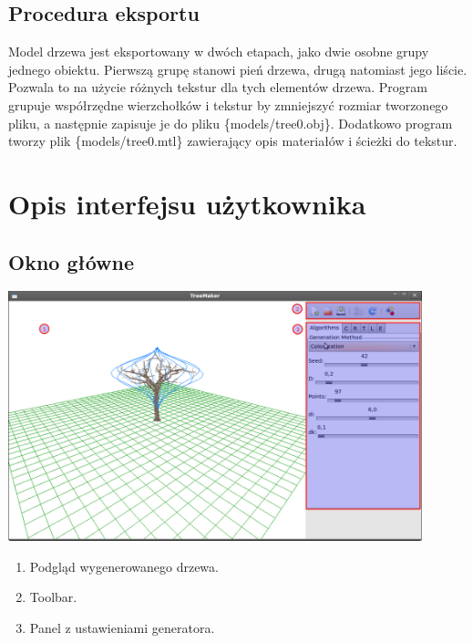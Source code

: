 \subsection{Procedura eksportu}
Model drzewa jest eksportowany w dwóch etapach, jako dwie osobne grupy jednego obiektu. Pierwszą grupę stanowi pień drzewa, drugą natomiast jego liście.
Pozwala to na użycie różnych tekstur dla tych elementów drzewa. Program grupuje współrzędne wierzchołków i tekstur by zmniejszyć rozmiar tworzonego pliku, a następnie
zapisuje je do pliku \{models/tree0.obj\}. Dodatkowo program tworzy plik \{models/tree0.mtl\} zawierający opis materiałów i ścieżki do tekstur. 
\section{Opis interfejsu użytkownika}

\subsection{Okno główne}
\includegraphics[width=120mm]{images/gui/main_window.png}
\begin{enumerate}
	\item {Podgląd wygenerowanego drzewa.}
	\item {Toolbar.}
	\item {Panel z ustawieniami generatora.}
\end{enumerate}

